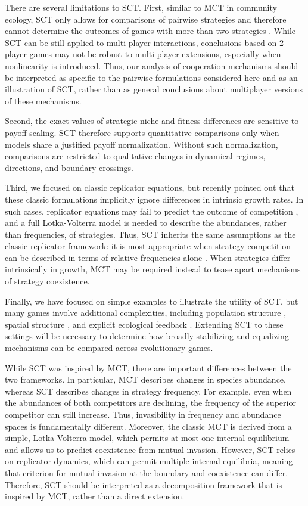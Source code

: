 \documentclass[12pt]{article}
\begin{document}
There are several limitations to SCT.
First, similar to MCT in community ecology, SCT only allows for comparisons of pairwise strategies and therefore cannot determine the outcomes of games with more than two strategies \citep{chesson2000mechanisms}.
While SCT can be still applied to multi-player interactions, conclusions based on 2-player games may not be robust to multi-player extensions, especially when nonlinearity is introduced.
Thus, our analysis of cooperation mechanisms should be interpreted as specific to the pairwise formulations considered here and as an illustration of SCT, rather than as general conclusions about multiplayer versions of these mechanisms.

Second, the exact values of strategic niche and fitness differences are sensitive to payoff scaling.
SCT therefore supports quantitative comparisons only when models share a justified payoff normalization. 
Without such normalization, comparisons are restricted to qualitative changes in dynamical regimes, directions, and boundary crossings. 

Third, we focused on classic replicator equations, but \cite{tarnita2025reconciling} recently pointed out that these classic formulations implicitly ignore differences in intrinsic growth rates.
In such cases, replicator equations may fail to predict the outcome of competition \citep{tarnita2025reconciling}, and a full Lotka-Volterra model is needed to describe the abundances, rather than frequencies, of strategies.
Thus, SCT inherits the same assumptions as the classic replicator framework: it is most appropriate when strategy competition can be described in terms of relative frequencies alone \citep{tarnita2025reconciling}.
When strategies differ intrinsically in growth, MCT may be required instead to tease apart mechanisms of strategy coexistence.

Finally, we have focused on simple examples to illustrate the utility of SCT, but many games involve additional complexities, including population structure \citep{nowak2010evolutionary}, spatial structure \citep{szabo2002phase,hauert2004spatial}, and explicit ecological feedback \citep{weitz2016oscillating,tarnita2025reconciling}.
Extending SCT to these settings will be necessary to determine how broadly stabilizing and equalizing mechanisms can be compared across evolutionary games.

While SCT was inspired by MCT, there are important differences between the two frameworks.
In particular, MCT describes changes in species abundance, whereas SCT describes changes in strategy frequency.
For example, even when the abundances of both competitors are declining, the frequency of the superior competitor can still increase.
Thus, invasibility in frequency and abundance spaces is fundamentally different. 
Moreover, the classic MCT is derived from a simple, Lotka-Volterra model, which permits at most one internal equilibrium and allows us to predict coexistence from mutual invasion.
However, SCT relies on replicator dynamics, which can permit multiple internal equilibria, meaning that criterion for mutual invasion at the boundary and coexistence can differ.
Therefore, SCT should be interpreted as a decomposition framework that is inspired by MCT, rather than a direct extension.
\end{document}
